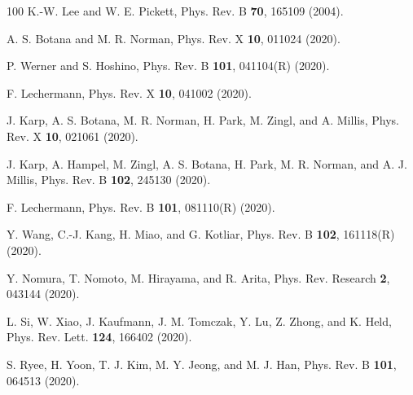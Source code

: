 \documentclass[prl,twocolumn,preprintnumbers,superscriptaddress]{revtex4-1}
\begin{document}
\begin{thebibliography}{100}
K.-W. Lee and W. E. Pickett, Phys. Rev. B \textbf{70}, 165109 (2004).

A. S. Botana and M. R. Norman, Phys. Rev. X \textbf{10}, 011024 (2020).


P. Werner and S. Hoshino, Phys. Rev. B \textbf{101}, 041104(R) (2020).

F. Lechermann, Phys. Rev. X \textbf{10}, 041002 (2020).

J. Karp, A. S. Botana, M. R. Norman, H. Park, M. Zingl, and A. Millis,  Phys. Rev. X \textbf{10}, 021061 (2020).

J. Karp, A. Hampel, M. Zingl, A. S. Botana, H. Park, M. R. Norman, and A. J. Millis, Phys. Rev. B \textbf{102}, 245130 (2020).

F. Lechermann, Phys. Rev. B \textbf{101}, 081110(R) (2020).

Y. Wang, C.-J. Kang, H. Miao, and G. Kotliar, Phys. Rev. B \textbf{102}, 161118(R) (2020).

Y. Nomura, T. Nomoto, M. Hirayama, and R. Arita, Phys. Rev. Research \textbf{2}, 043144 (2020).

L. Si, W. Xiao, J. Kaufmann, J. M. Tomczak, Y. Lu, Z. Zhong, and K. Held, Phys. Rev. Lett. \textbf{124}, 166402 (2020).

S. Ryee, H. Yoon, T. J. Kim, M. Y. Jeong, and M. J. Han, Phys. Rev. B \textbf{101}, 064513 (2020).


\end{thebibliography}
\end{document}
